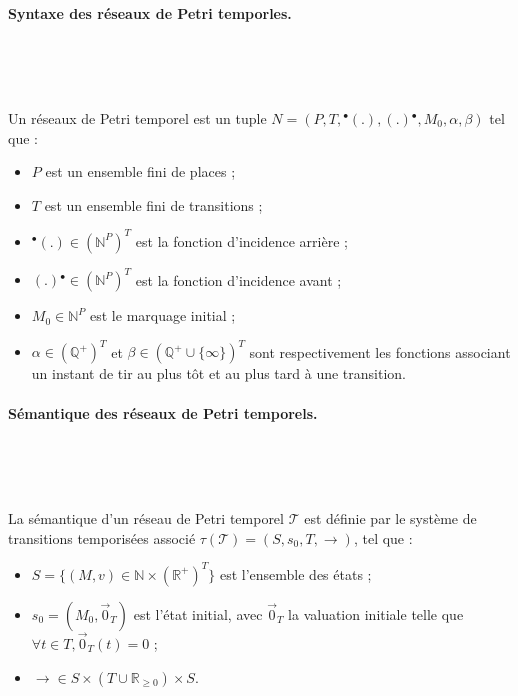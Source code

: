 \documentclass{article}
\begin{document}
      \paragraph{Syntaxe des réseaux de Petri temporles.} ~

        ~

        \noindent
        Un réseaux de Petri temporel est un tuple $N =
        (P,T,{}^{\bullet}(.),(.){}^{\bullet},M_0,\alpha,\beta)$ tel que :
      
        \begin{itemize}
          \item $P$ est un ensemble fini de places ;
          \item $T$ est un ensemble fini de transitions ;
          \item ${}^{\bullet}(.) \in (\mathbb{N}^P)^T$ est la fonction
            d'incidence arrière ;
          \item $(.){}^{\bullet} \in (\mathbb{N}^P)^T$ est la fonction
            d'incidence avant ;
          \item $M_0 \in \mathbb{N}^P$ est le marquage initial ;
          \item $\alpha \in (\mathbb{Q}^+)^T$ et $\beta \in (\mathbb{Q}^+ \cup
            \{ \infty \})^T$ sont respectivement les fonctions associant un
            instant de tir au plus tôt et au plus tard à une transition.
        \end{itemize}
      
      \paragraph{Sémantique des réseaux de Petri temporels.} ~

        ~
      
        La sémantique d'un réseau de Petri temporel $\mathcal{T}$ est définie
        par le système de transitions temporisées associé $\tau(\mathcal{T})
        = (S, s_0, T, \rightarrow)$, tel que :
        
        \begin{itemize}
          \item $S = \{(M,v) \in \mathbb{N} \times (\mathbb{R}^+)^T\}$ est
            l'ensemble des états ;
          \item $s_0 = (M_0, \vec{0}_T)$ est l'état initial, avec $\vec{0}_T$ la
            valuation initiale telle que $\forall t \in T, \vec{0}_T(t) = 0$ ;
          \item $\rightarrow \in S \times (T \cup \mathbb{R}_{\geq 0}) \times
            S$.
        \end{itemize}
        
\end{document}
